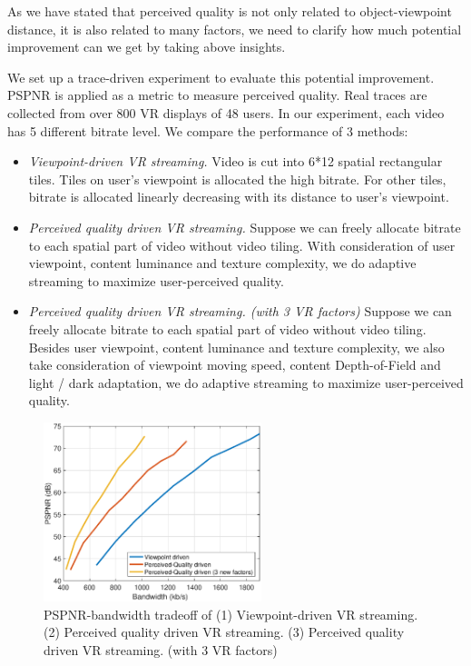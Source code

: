 As we have stated that perceived quality is not only related to object-viewpoint distance, it is also related to many factors, we need to clarify how much potential improvement can we get by taking above insights.

We set up a trace-driven experiment to evaluate this potential improvement. PSPNR \cite{PSPNR} is applied as a metric to measure perceived quality. Real traces are collected from over 800 VR displays of 48 users. In our experiment, each video has 5 different bitrate level. We compare the performance of 3 methods:

\begin{itemize}

\item \emph{Viewpoint-driven VR streaming.} Video is cut into 6*12 spatial rectangular tiles. Tiles on user's viewpoint is allocated the high bitrate. For other tiles, bitrate is allocated linearly decreasing with its distance to user's viewpoint.

\item \emph{Perceived quality driven VR streaming.} Suppose we can freely allocate bitrate to each spatial part of video without video tiling. With consideration of user viewpoint, content luminance and texture complexity, we do adaptive streaming to maximize user-perceived quality.

\item \emph{Perceived quality driven VR streaming. (with 3 VR factors)} Suppose we can freely allocate bitrate to each spatial part of video without video tiling. Besides user viewpoint, content luminance and texture complexity, we also take consideration of viewpoint moving speed, content Depth-of-Field and light / dark adaptation, we do adaptive streaming to maximize user-perceived quality.

\end{itemize}

\begin{figure}
  \centering
  \includegraphics[width=2.5in]{images/improvement.eps}
  \caption{PSPNR-bandwidth tradeoff of (1) Viewpoint-driven VR streaming. (2) Perceived quality driven VR streaming. (3) Perceived quality driven VR streaming. (with 3 VR factors)}
  \label{potential1}
  \end{figure}

